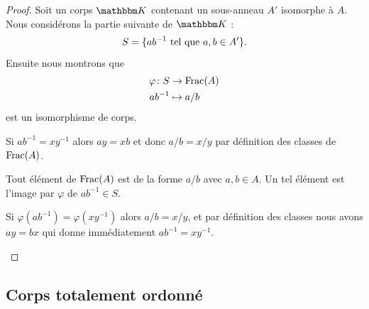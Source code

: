 \begin{proof}
    Soit un corps \( \eK\) contenant un sous-anneau \( A'\) isomorphe à \( A\). Nous considérons la partie suivante de \( \eK\) :
    \begin{equation}
        S=\{ ab^{-1}\text{ tel que } a,b\in A' \}.
    \end{equation}
    Ensuite nous montrons que
    \begin{equation}
        \begin{aligned}
            \varphi\colon S&\to \operatorname{Frac}(A) \\
            ab^{-1}&\mapsto a/b
        \end{aligned}
    \end{equation}
    est un isomorphisme de corps.

    \begin{subproof}
        \item[Bien définie]

            Si \( ab^{-1}=xy^{-1}\) alors \( ay=xb\) et donc \( a/b=x/y\) par définition des classes de \( \operatorname{Frac}(A)\).

        \item[Surjectif]

            Tout élément de \( \operatorname{Frac}(A)\) est de la forme \( a/b\) avec \( a,b\in A\). Un tel élément est l'image par \( \varphi\) de \( ab^{-1}\in S\).

        \item[Injectif]

            Si \( \varphi(ab^{-1})=\varphi(xy^{-1})\) alors \( a/b=x/y\), et par définition des classes nous avons \( ay=bx\) qui donne immédiatement \( ab^{-1}=xy^{-1}\).
    \end{subproof}
\end{proof}

\subsection{Corps totalement ordonné}

